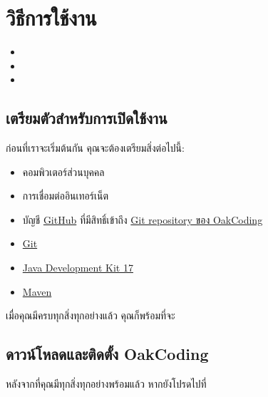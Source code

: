 \section{วิธีการใช้งาน}
\label{sec:usage}

\setlength{\baselineskip}{1ex}

\begin{itemize}[leftmargin=0pt]
    \item[] 
    \item[] 
    \item[] 
\end{itemize}

\rule{0em}{1ex}

\subsection{เตรียมตัวสำหรับการเปิดใช้งาน}
\label{subsec:prep-install}

ก่อนที่เราจะเริ่มต้นกัน คุณจะต้องเตรียมสิ่งต่อไปนี้:

\begin{itemize}
    \item คอมพิวเตอร์ส่วนบุคคล
    \item การเชื่อมต่ออินเทอร์เน็ต
    \item บัญชี \href{https://github.com/}{GitHub} ที่มีสิทธิ์เข้าถึง \href{https://github.com/CS211-651/project211-oakcoding.git}{Git repository ของ OakCoding}
    \item \href{https://git-scm.com/}{Git}
    \item \href{https://openjdk.org/}{Java Development Kit 17}
    \item \href{https://maven.apache.org/}{Maven}
\end{itemize}

เมื่อคุณมีครบทุกสิ่งทุกอย่างแล้ว คุณก็พร้อมที่จะ

\clearpage
\subsection{ดาวน์โหลดและติดตั้ง OakCoding}
\label{subsec:install}

หลังจากที่คุณมีทุกสิ่งทุกอย่างพร้อมแล้ว หากยังโปรดไปที่\linebreak[3]\mbox{\textbf{}}\\

